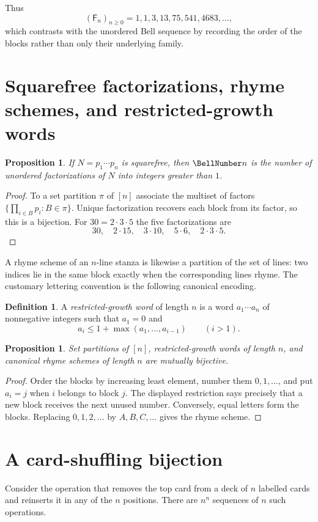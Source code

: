 \documentclass[11pt,a4paper,oneside,openany]{book}
\newtheorem{proposition}[theorem]{Proposition}
\theoremstyle{definition}
\newtheorem{definition}[theorem]{Definition}
\theoremstyle{remark}
\begin{document}
Thus
\[
 (\mathsf F_n)_{n\ge0}=1,1,3,13,75,541,4683,\ldots,
\]
which contrasts with the unordered Bell sequence by recording the order of the
blocks rather than only their underlying family.
\section{Squarefree factorizations, rhyme schemes, and restricted-growth words}
\begin{proposition}
If $N=p_1\cdots p_n$ is squarefree, then $\BellNumber n$ is the number of unordered
factorizations of $N$ into integers greater than $1$.
\end{proposition}
\begin{proof}
To a set partition $\pi$ of $[n]$ associate the multiset of factors
$\{\prod_{i\in B}p_i:B\in\pi\}$.  Unique factorization recovers each block from
its factor, so this is a bijection.  For $30=2\cdot3\cdot5$ the five
factorizations are
\[
 30,\quad 2\cdot15,\quad3\cdot10,\quad5\cdot6,\quad2\cdot3\cdot5.
\]
\end{proof}

A rhyme scheme of an $n$-line stanza is likewise a partition of the set of lines:
two indices lie in the same block exactly when the corresponding lines rhyme.
The customary lettering convention is the following canonical encoding.

\begin{definition}
A \emph{restricted-growth word} of length $n$ is a word
$a_1\cdots a_n$ of nonnegative integers such that $a_1=0$ and
\[
 a_i\le 1+\max(a_1,\ldots,a_{i-1})\qquad(i>1).
\]
\end{definition}

\begin{proposition}
Set partitions of $[n]$, restricted-growth words of length $n$, and canonical
rhyme schemes of length $n$ are mutually bijective.
\end{proposition}
\begin{proof}
Order the blocks by increasing least element, number them $0,1,\ldots$, and put
$a_i=j$ when $i$ belongs to block $j$.  The displayed restriction says precisely
that a new block receives the next unused number.  Conversely, equal letters form
the blocks.  Replacing $0,1,2,\ldots$ by $A,B,C,\ldots$ gives the rhyme scheme.
\end{proof}

\section{A card-shuffling bijection}
Consider the operation that removes the top card from a deck of $n$ labelled cards
and reinserts it in any of the $n$ positions.  There are $n^n$ sequences of $n$
such operations.
\end{document}
